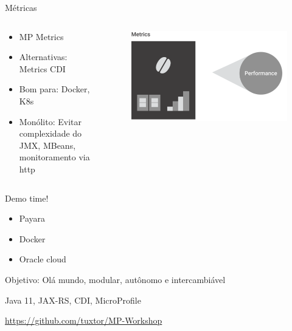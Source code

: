 \documentclass[aspectratio=169]{beamer}
\begin{document}
\begin{frame}{Métricas}

\begin{columns}
    \begin{column}{0.7\textwidth}
\begin{itemize}
    \item MP Metrics
    \item Alternativas: Metrics CDI
    \item Bom para: Docker, K8s
    \item Monólito: Evitar complexidade do JMX, MBeans, monitoramento via http
\end{itemize}
	\end{column}
	\begin{column}{0.4\textwidth}  %

\begin{figure}
	\centering
	\includegraphics[width=\linewidth]{Images/metrics}
\end{figure}

	\end{column}
\end{columns}

\end{frame}



\begin{frame}{Demo time!}

\begin{itemize}
    \item Payara
    \item Docker
    \item Oracle cloud
\end{itemize}

Objetivo: Olá mundo, modular, autônomo e intercambiável

Java 11, JAX-RS, CDI, MicroProfile

\normalsize  \url{https://github.com/tuxtor/MP-Workshop}\\

\end{frame}
\end{document}
